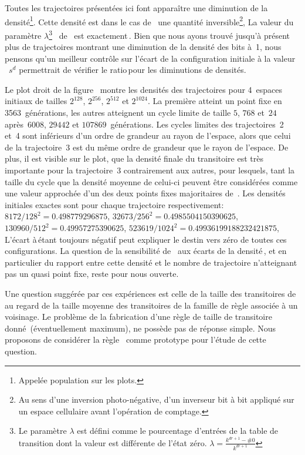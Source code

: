 Toutes les trajectoires pr\'esent\'ees ici font appara\^itre une diminution de
la densit\'e\footnote{%
  Appel\'ee population sur les plots.}. %
Cette densit\'e est dans le cas de~ une quantit\'e
inversible\footnote{%
  Au sens d'une inversion photo-n\'egative, d'un inverseur bit \`a bit appliqu\'e
  sur un espace cellulaire avant l'op\'eration de comptage.}, %
La valeur du param\`etre $\lambda$\footnote{%
  Le param\`etre $\lambda$ est d\'efini comme le pourcentage d'entr\'ees de
  la table de transition dont la valeur est diff\'erente de l'\'etat z\'ero. %
  $\lambda = \frac{k^{dr+1}-\#0}{k^{dr+1}}$}~\cite{Li90a,Li90b}
de~ est exactement\,\undemi. %
Bien que nous ayons trouv\'e jusqu'\`a pr\'esent plus de trajectoires
montrant une diminution de la densit\'e des bits \`a~1, nous pensons qu'un
meilleur contr\^ole sur l'\'ecart de la configuration initiale \`a la
valeur\,\undemi~$s^d$ permettrait de v\'erifier le ratio\,\undemi pour
les diminutions de densit\'es. %

Le plot droit de la figure~ montre les
densit\'es des trajectoires pour 4~espaces initiaux de tailles
$2^{128}$, $2^{256}$, $2^{512}$ et $2^{1024}$. %
La premi\`ere atteint un point fixe en 3563~g\'en\'erations, les autres
atteignent un cycle limite de taille $5$, $768$ et~$24$ apr\`es~$6008$,
$29442$ et $107869$~g\'en\'erations. %
Les cycles limites des trajectoires~2 et~4 sont inf\'erieurs d'un ordre
de grandeur au rayon de l'espace, alors que celui de la trajectoire~3
est du m\^eme ordre de grandeur que le rayon de l'espace. %
De plus, il est visible sur le plot, que la densit\'e finale du
transitoire est tr\`es importante pour la trajectoire~3 contrairement
aux autres, pour lesquels, tant la taille du cycle que la densit\'e
moyenne de celui-ci peuvent \^etre consid\'er\'ees comme une valeur approch\'ee
d'un des deux points fixes majoritaires de~. %
Les densit\'es initiales exactes sont pour chaque trajectoire
respectivement:~%
$8172/128^2 = 0.498779296875$, %
$32673/256^2 = 0.4985504150390625$, %
$130960/512^2 = 0.49957275390625$, %
$523619/1024^2 = 0.49936199188232421875$, %
L'\'ecart \`a\,\undemi \'etant toujours n\'egatif peut expliquer le destin
vers z\'ero de toutes ces configurations. %
La question de la sensibilit\'e de~ aux \'ecarts de la
densit\'e\,\undemi, et en particulier du rapport entre cette densit\'e et
le nombre de trajectoire n'atteignant pas un quasi point fixe, reste
pour nous ouverte. %

Une question sugg\'er\'ee par ces exp\'eriences est celle de la taille des
transitoires de~ au regard de la taille moyenne des
transitoires de la famille de r\`egle associ\'ee \`a un voisinage. %
Le probl\`eme de la fabrication d'une r\`egle de taille de
transitoire donn\'e~(\'eventuellement maximum), ne poss\`ede pas de r\'eponse
simple. %
Nous proposons de consid\'erer la r\`egle~ comme prototype
pour l'\'etude de cette question. %

